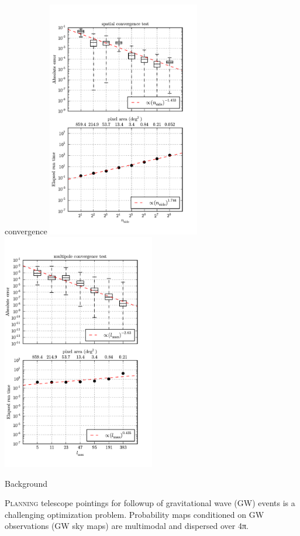 \documentclass[portrait]{a0poster}
\newcommand{\heading}[1]{{\fontspec{Marvel}\Huge\noindent#1}\vspace{1em}}
\begin{document}
\begin{staticcontents*}{convergence}
\includegraphics[width=0.5\textwidth]{spatial}
\includegraphics[width=0.5\textwidth]{multipole}
\end{staticcontents*}

\heading{Background}

\framebreak

\lettrine{P}{\textnormal{lanning}} telescope pointings for followup of gravitational wave (GW) events is a challenging optimization problem.  Probability maps conditioned on GW observations (GW sky maps) are multimodal and dispersed over 4π.
\end{document}
